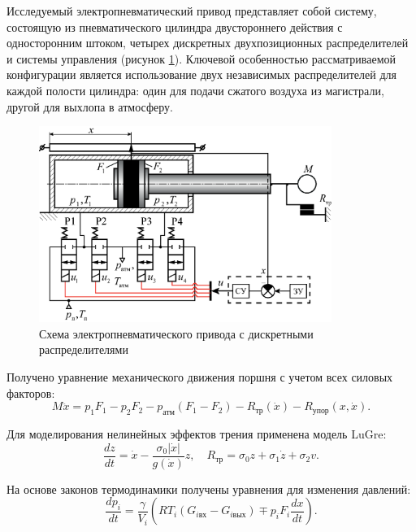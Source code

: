 Исследуемый электропневматический привод представляет собой систему, состоящую из пневматического цилиндра
двустороннего действия с односторонним штоком, четырех дискретных двухпозиционных распределителей и
системы управления (рисунок \ref{fig:pneumatic_cylinder}). Ключевой особенностью рассматриваемой конфигурации
является использование двух
независимых распределителей для каждой полости цилиндра: один для подачи сжатого воздуха из магистрали,
другой для выхлопа в атмосферу.

\begin{figure}[ht]
	\centering
	\includegraphics[width=0.85\textwidth]{Dissertation/images/part2/расчетная_схема_привода.eps}
	\caption{Схема электропневматического привода с дискретными распределителями}
	\label{fig:pneumatic_cylinder}
\end{figure}

Получено уравнение механического движения поршня с учетом всех силовых факторов:
\begin{equation}
	M\ddot{x} = p_1F_1 - p_2F_2 - p_\text{атм}(F_1 - F_2) - R_\text{тр}(\dot{x}) - R_\text{упор}(x,\dot{x}).
\end{equation}

Для моделирования нелинейных эффектов трения применена модель LuGre:
\begin{equation}
	\frac{dz}{dt} = \dot{x} - \frac{\sigma_0|\dot{x}|}{g(\dot{x})}z,\quad
	R_\text{тр} = \sigma_0z + \sigma_1\dot{z} + \sigma_2v.
\end{equation}

На основе законов термодинамики получены уравнения для изменения давлений:
\begin{equation}
	\frac{dp_i}{dt} = \frac{\gamma}{V_i}\left(RT_i(G_{i\text{вх}} - G_{i\text{вых}}) \mp p_i F_i\frac{dx}{dt}\right).
\end{equation}

